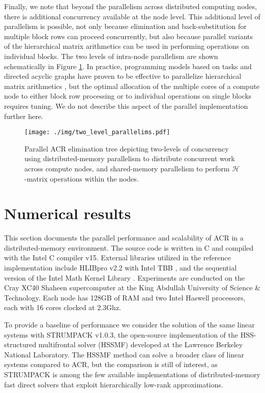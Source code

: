 \documentclass[]{elsarticle}
\begin{document}
Finally, we note that beyond the parallelism across distributed computing nodes, there is additional concurrency available at the node level. This additional level of parallelism is possible, not only because elimination and back-substitution for multiple block rows can proceed concurrently, but also because parallel variants of the hierarchical matrix arithmetics can be used in performing operations on individual blocks. The two levels of intra-node parallelism are shown schematically in Figure \ref{two_levels_parallelism}. In practice, programming models based on tasks and directed acyclic graphs have proven to be effective to parallelize hierarchical matrix arithmetics \cite{Kriemann2014,Ghysels15}, but the optimal allocation of the multiple cores of a compute node to either block row processing or to individual operations on single blocks requires tuning. We do not describe this aspect of the parallel implementation further here.

\begin{figure}[H]
\centering
\texttt{[image: ./img/two\_level\_parallelims.pdf]}
\caption{Parallel ACR elimination tree depicting two-levels of concurrency using distributed-memory parallelism to distribute concurrent work across compute nodes, and shared-memory parallelism to perform $\mathcal{H}$-matrix operations within the nodes.}
\label{two_levels_parallelism}
\end{figure}

\section{Numerical results}
\label{numerical_results}

This section documents the parallel performance and scalability of ACR in a distributed-memory environment. 
The source code is written in C and compiled with the Intel C compiler v15. External libraries utilized in the reference implementation include HLIBpro v2.2 with Intel TBB \cite{kriem05,grasedyck2008performance}, and the sequential version of the Intel Math Kernel Library \cite{kalinkin2015schur}.
Experiments are conducted on the Cray XC40 Shaheen supercomputer at the King Abdullah University of Science $\&$ Technology. Each node has 128GB of RAM and two Intel Haswell processors, each with 16 cores clocked at 2.3Ghz.

To provide a baseline of performance we consider the solution of the same linear systems with STRUMPACK \cite{Ghysels15} v1.0.3, the open-source implementation of the HSS-structured multifrontal solver (HSSMF) developed at the Lawrence Berkeley National Laboratory. The HSSMF method can solve a broader class of linear systems compared to ACR, but the comparison is still of interest, as STRUMPACK is among the few available implementations of distributed-memory fast direct solvers that exploit hierarchically low-rank approximations.
\end{document}
